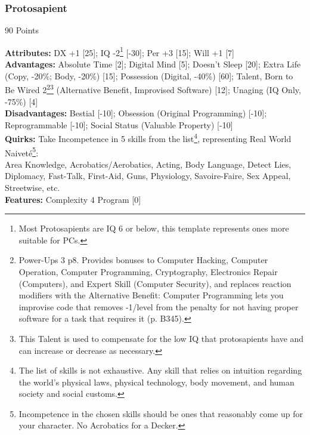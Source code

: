 \begin{multicols*}{3}
	\subsubsection*{Protosapient}
	\begin{flushright}
		90 Points
	\end{flushright}
	\textbf{Attributes:} 
	DX +1 [25]; IQ -2\footnote{Most Protosapients are IQ 6 or below, this template represents ones more suitable for PCs.} [-30]; Per +3 [15]; Will +1 [7]
	\\\textbf{Advantages:} 
	Absolute Time [2]; Digital Mind [5]; Doesn't Sleep [20]; Extra Life (Copy, -20\%; Body, -20\%) [15]; Possession (Digital, -40\%) [60]; Talent, Born to Be Wired 2\footnote{Power-Ups 3 p8. Provides bonuses to Computer Hacking, Computer Operation, Computer Programming, Cryptography, Electronics Repair (Computers), and Expert Skill (Computer Security), and replaces reaction modifiers with the Alternative Benefit: Computer Programming lets you improvise code that removes -1/level from the penalty for not having proper software for a task that requires it (p. B345).}\footnote{This Talent is used to compensate for the low IQ that protosapients have and can increase or decrease as necessary.} (Alternative Benefit, Improvised Software) [12]; Unaging (IQ Only, -75\%) [4]
	\\\textbf{Disadvantages:} 
	Bestial [-10]; Obsession (Original Programming) [-10]; Reprogrammable [-10]; Social Status (Valuable Property) [-10]
	\\\textbf{Quirks:}
	Take Incompetence in 5 skills from the list\footnote{The list of skills is not exhaustive. Any skill that relies on intuition regarding the world's physical laws, physical technology, body movement, and human society and social customs.}, representing Real World Naiveté\footnote{Incompetence in the chosen skills should be ones that reasonably come up for your character. No Acrobatics for a Decker.}:\\
	Area Knowledge, Acrobatics/Aerobatics, Acting, Body Language, Detect Lies, Diplomacy, Fast-Talk, First-Aid, Guns, Physiology,  Savoire-Faire, Sex Appeal, Streetwise, etc.
	\\\textbf{Features:}
	Complexity 4 Program [0]
	

\end{multicols*}

